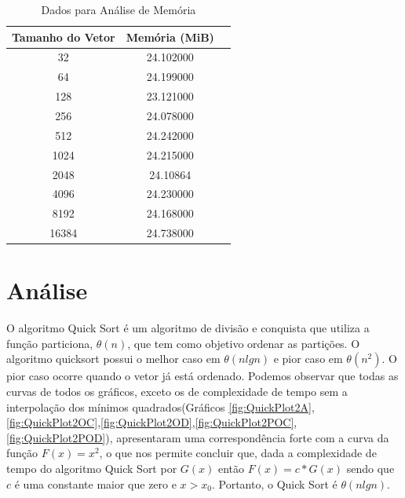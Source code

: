 \documentclass[12pt,a4paper,twoside]{report}
\begin{document}
\begin{table}[h]
  \centering
  \caption{Dados para Análise de Memória \label{tab:memoria}}
  \begin{tabular}{ccc} \\\hline
  \textbf{Tamanho do Vetor} & \textbf{Memória (MiB)} \\\hline
  32                        & 24.102000                  \\\hline
  64                        & 24.199000            \\\hline
  128                       & 23.121000            \\\hline
  256                       & 24.078000            \\\hline
  512                       & 24.242000            \\\hline
  1024                       & 24.215000            \\\hline
  2048                       & 24.10864            \\\hline
  4096                       & 24.230000            \\\hline
  8192                       & 24.168000            \\\hline
  16384                       & 24.738000            \\\hline

  \end{tabular}
\end{table}


\chapter{Análise}

O algoritmo Quick Sort é um algoritmo de divisão e conquista que utiliza a função particiona, $\theta(n)$, que tem como objetivo ordenar as partições. O algoritmo quicksort possui o melhor caso em $\theta(nlgn)$ e pior caso em $\theta(n^2)$. O pior caso ocorre quando o vetor já está ordenado.
Podemos observar que todas as curvas de todos os gráficos, exceto os de complexidade de tempo sem a interpolação dos mínimos quadrados(Gráficos \ref{fig:QuickPlot2A},\ref{fig:QuickPlot2OC},\ref{fig:QuickPlot2OD},\ref{fig:QuickPlot2POC},\ref{fig:QuickPlot2POD}), apresentaram uma correspondência forte com a curva da função $F(x) = x^2$, o que nos permite concluir que, dada a complexidade de tempo do algoritmo Quick Sort por $G(x)$ então $F(x) = c * G(x)$ sendo que $c$ é uma constante maior que zero e $x > x_0$. Portanto, o Quick Sort é $\theta(nlgn)$.
\end{document}
